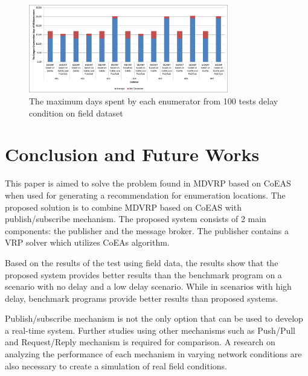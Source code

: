 \documentclass[conference]{IEEEtran}
\begin{document}
\begin{figure}[!]
	\centering
	\includegraphics[width=8.7cm]{Resources/Images/test_result_delay_real_tw_mean_stdev_of_total_time_en}
	\caption{The maximum days spent by each enumerator from 100 tests delay condition on field dataset}
	\label{fig:test_result_delay_real_tw_mean_stdev_of_total_time}
\end{figure}

\section{Conclusion and Future Works}
\label{sec:conclusion-future-works}
This paper is aimed to solve the problem found in MDVRP based on CoEAS when used for generating a recommendation for enumeration locations. The proposed solution is to combine MDVRP based on CoEAS with publish/subscribe mechanism. The proposed system consists of 2 main components: the publisher and the message broker. The publisher contains a VRP solver which utilizes CoEAs algorithm.

Based on the results of the test using field data, the results show that the proposed system provides better results than the benchmark program on a scenario with no delay and a low delay scenario. While in scenarios with high delay, benchmark programs provide better results than proposed systems.

Publish/subscribe mechanism is not the only option that can be used to develop a real-time system. Further studies using other mechanisms such as Push/Pull and Request/Reply mechanism is required for comparison. A research on analyzing the performance of each mechanism in varying network conditions are also necessary to create a simulation of real field conditions.
\end{document}
